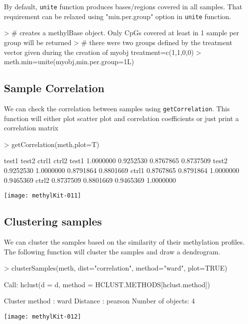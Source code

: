 \documentclass{article}
\begin{document}
By default, \texttt{unite} function produces bases/regions covered in all samples. That requirement can be relaxed using "min.per.group" option in \texttt{unite} function.
\begin{Schunk}
\begin{Sinput}
> # creates a methylBase object. Only CpGs covered at least in 1 sample per group will be returned
> # there were two groups defined by the treatment vector given during the creation of myobj treatment=c(1,1,0,0)
> meth.min=unite(myobj,min.per.group=1L)
\end{Sinput}
\end{Schunk}
\subsection{Sample Correlation}
We can check the correlation between samples using \texttt{getCorrelation}. This function will either plot scatter plot and correlation coefficients or just print a correlation matrix

\begin{center}
\begin{Schunk}
\begin{Sinput}
> getCorrelation(meth,plot=T)
\end{Sinput}
\begin{Soutput}
          test1     test2     ctrl1     ctrl2
test1 1.0000000 0.9252530 0.8767865 0.8737509
test2 0.9252530 1.0000000 0.8791864 0.8801669
ctrl1 0.8767865 0.8791864 1.0000000 0.9465369
ctrl2 0.8737509 0.8801669 0.9465369 1.0000000
\end{Soutput}
\end{Schunk}
\texttt{[image: methylKit-011]}
\end{center}

\subsection{Clustering samples}
We can cluster the samples based on the similarity of their methylation profiles. The following function will cluster the samples and draw a dendrogram.
\begin{center}
\begin{Schunk}
\begin{Sinput}
> clusterSamples(meth, dist="correlation", method="ward", plot=TRUE)
\end{Sinput}
\begin{Soutput}
Call:
hclust(d = d, method = HCLUST.METHODS[hclust.method])

Cluster method   : ward 
Distance         : pearson 
Number of objects: 4 
\end{Soutput}
\end{Schunk}
\texttt{[image: methylKit-012]}
\end{center}
\end{document}
